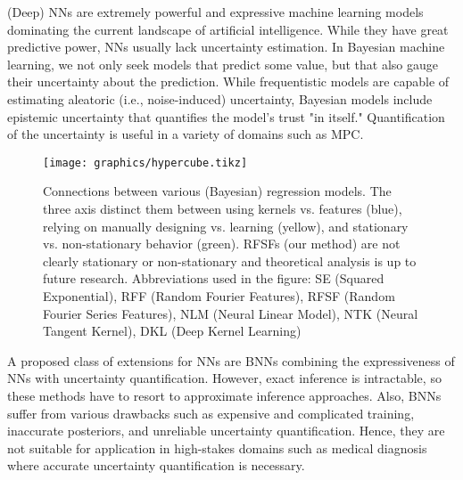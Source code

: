 (Deep) \acp{NN} are extremely powerful and expressive machine learning models dominating the current landscape of artificial intelligence\cite{krizhevskyImageNetClassificationDeep2012}.
While they have great predictive power, \acp{NN} usually lack uncertainty estimation.
In Bayesian machine learning, we not only seek models that predict some value, but that also gauge their uncertainty about the prediction.
While frequentistic models are capable of estimating aleatoric (i.e., noise-induced) uncertainty, Bayesian models include epistemic uncertainty that quantifies the model's trust "in itself."
Quantification of the uncertainty is useful in a variety of domains such as \ac{MPC}\cite{hewingLearningBasedModelPredictive2020,bradfordStochasticDatadrivenModel2020}.

\begin{figure}
	\centering
	\texttt{[image: graphics/hypercube.tikz]}
	\caption{
		Connections between various (Bayesian) regression models.
		The three axis distinct them between using kernels vs. features (blue), relying on manually designing vs. learning (yellow), and stationary vs. non-stationary behavior (green).
		\acsp{RFSF} (our method) are not clearly stationary or non-stationary and theoretical analysis is up to future research.
		Abbreviations used in the figure: \acs{SE} (Squared Exponential), \acs{RFF} (Random Fourier Features), \acs{RFSF} (Random Fourier Series Features), \acs{NLM} (Neural Linear Model), \acs{NTK} (Neural Tangent Kernel), \acs{DKL} (Deep Kernel Learning)
	}
	\label{fig:hypercube}
\end{figure}

A proposed class of extensions for \acp{NN} are \acp{BNN}\cite{mackayPracticalBayesianFramework1992,nealBayesianLearningNeural2012} combining the expressiveness of \acp{NN} with uncertainty quantification.
However, exact inference is intractable, so these methods have to resort to approximate inference approaches\cite{nealBayesianLearningNeural2012,hernandez-lobatoProbabilisticBackpropagationScalable2015,denkerTransformingNeuralNetOutput1990,galDropoutBayesianApproximation2016,lakshminarayananSimpleScalablePredictive2017,blundellWeightUncertaintyNeural2015}.
Also, \acp{BNN} suffer from various drawbacks such as expensive and complicated training, inaccurate posteriors, and unreliable uncertainty quantification\cite{foongExpressivenessApproximateInference2020,foongInBetweenUncertaintyBayesian2019,osbandRandomizedPriorFunctions2018,ovadiaCanYouTrust2019,wenzelHowGoodBayes2020,yaoQualityUncertaintyQuantification2019}.
Hence, they are not suitable for application in high-stakes domains such as medical diagnosis where accurate uncertainty quantification is necessary\cite{watsonLatentDerivativeBayesian2021}.

